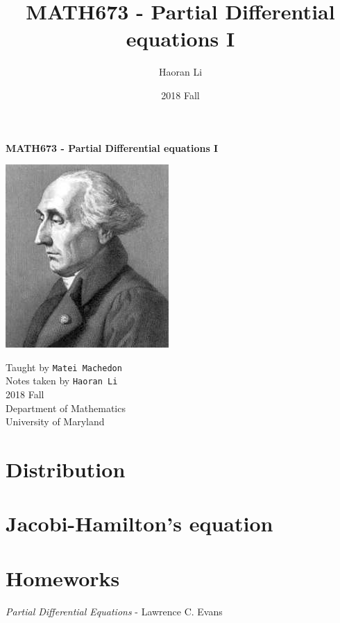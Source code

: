 \documentclass[a4paper,10pt]{article}
\title{MATH673 - Partial Differential equations I}
\author{Haoran Li}
\date{2018 Fall}
\begin{document}
\sloppy %

\begin{titlepage}
\begin{center}
\vspace*{1cm}
\LARGE
\textbf{MATH673 - Partial Differential equations I} \\
\vspace{2cm}
\begin{center}
\includegraphics{Pictures/Lagrange.jpg}
\end{center}
\vspace{2cm}
\normalsize
Taught by \texttt{Matei Machedon} \\
Notes taken by \texttt{Haoran Li} \\
2018 Fall \\
\vspace{2cm}
Department of Mathematics\\
University of Maryland\\
\end{center}
\end{titlepage}

\tableofcontents
\newpage

\section{Distribution}

\newpage

\section{Jacobi-Hamilton's equation}

\newpage

\section{Homeworks}

\newpage

\begin{thebibliography}{}

\textit{Partial Differential Equations} - Lawrence C. Evans

\end{thebibliography}

\printindex
\newpage
\end{document}
